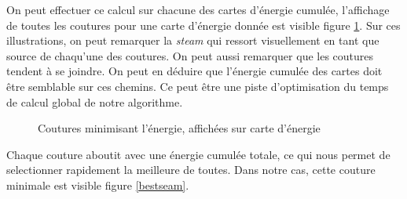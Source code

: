 \documentclass[a4paper]{article}
\begin{document}
On peut effectuer ce calcul sur chacune des cartes d'énergie cumulée, l'affichage de toutes les coutures pour
une carte d'énergie donnée est visible figure \ref{allseams}. Sur ces illustrations, on peut remarquer la
{\em steam} qui ressort visuellement en tant que source de chaqu'une des coutures.
On peut aussi remarquer que les coutures tendent à se joindre. On peut en déduire que l'énergie
cumulée des cartes doit être semblable sur ces chemins. Ce peut être une piste d'optimisation du temps de
calcul global de notre algorithme.

\begin{figure}[!ht]%
    \centering
    \hspace{0.030\textwidth}
    \caption{Coutures minimisant l'énergie, affichées sur carte d'énergie}
    \label{allseams}
\end{figure}

Chaque couture aboutit avec une énergie cumulée totale, ce qui nous permet de selectionner rapidement la
meilleure de toutes. Dans notre cas, cette couture minimale est visible figure \ref{bestseam}.
\end{document}
